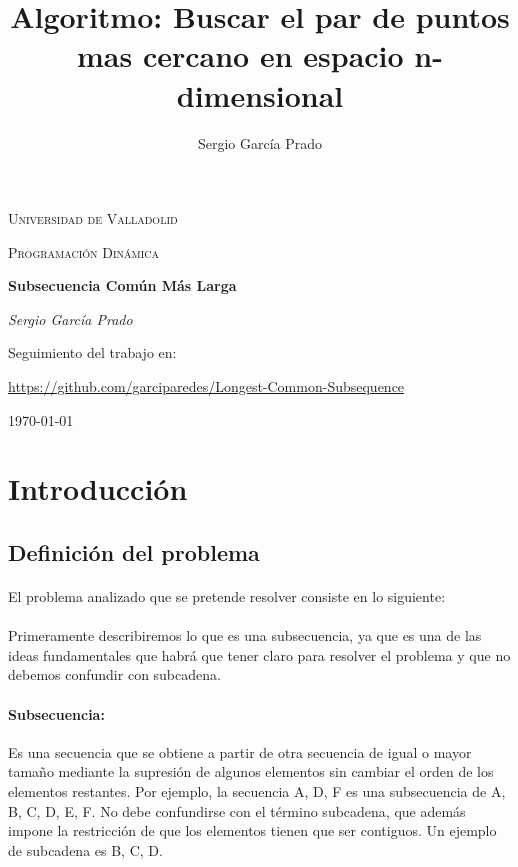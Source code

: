 \documentclass{article}
\title{Algoritmo: Buscar el par de puntos mas cercano en espacio n-dimensional}
\author{Sergio García Prado}
\begin{document}
\begin{titlepage}
	\centering
	{\scshape\LARGE Universidad de Valladolid \par}
	\vspace{1cm}
	{\scshape\Large Programación Dinámica\par}
	\vspace{1.5cm}
	{\huge\bfseries Subsecuencia Común Más Larga\par}
	\vspace{2cm}
	{\Large\itshape Sergio García Prado\par}
	
	\vfill
	Seguimiento del trabajo en: \par
	\href{https://github.com/garciparedes/Longest-Common-Subsequence}{https://github.com/garciparedes/Longest-Common-Subsequence}

	\vfill


	{\large \today\par}
\end{titlepage}

\section{Introducción}
	
	\subsection{Definición del problema}
	
		\paragraph{}
		El problema analizado que se pretende resolver consiste en lo siguiente:
		
		\paragraph{}
		Primeramente describiremos lo que es una subsecuencia, ya que es una de las ideas fundamentales que habrá que tener claro para resolver el problema y que no debemos confundir con subcadena.
		
		\paragraph{Subsecuencia:}
		Es una secuencia que se obtiene a partir de otra secuencia de igual o mayor tamaño mediante la supresión de algunos elementos sin cambiar el orden de los elementos restantes. Por ejemplo, la secuencia A, D, F es una subsecuencia de A, B, C, D, E, F. 
		\newline
		No debe confundirse con el término subcadena, que además impone la restricción de que los elementos tienen que ser contiguos. Un ejemplo de subcadena es B, C, D.
		
\end{document}
